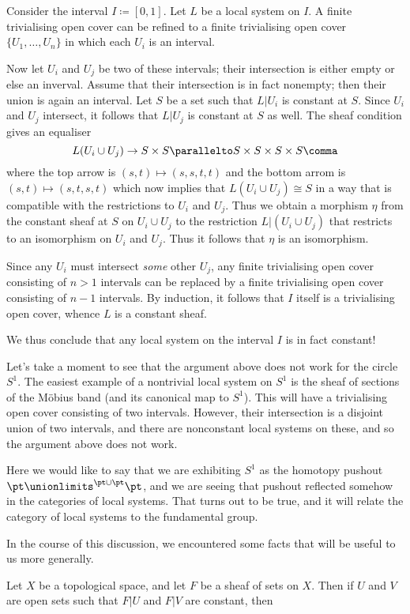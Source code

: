 \begin{exm}
	Consider the interval $ I \coloneq [0, 1] $.
	Let $ L $ be a local system on $ I $.
	A finite trivialising open cover can be refined to a finite trivialising open cover $ \{ U_1, \dots, U_n \} $ in which each $ U_{i} $ is an interval.

	Now let $ U_{i} $ and $ U_{j} $ be two of these intervals;
	their intersection is either empty or else an inverval.
	Assume that their intersection is in fact nonempty;
	then their union is again an interval.
	Let $ S $ be a set such that $ L | U_{i} $ is constant at $ S $.
	Since $ U_{i} $ and $ U_{j} $ intersect, it follows that $ L | U_{j} $ is constant at $ S $ as well.
	The sheaf condition gives an equaliser
	\[
		L(U_{i} \cup U_{j}) \to S \times S \parallelto S \times S \times S \times S \comma
	\]
	where the top arrow is $ (s, t) \mapsto (s, s, t, t) $ and the bottom arrom is $ (s, t) \mapsto (s, t, s, t) $ which now implies that $ L(U_{i} \cup U_{j}) \cong S $ in a way that is compatible with the restrictions to $ U_{i} $ and $ U_{j} $.
	Thus we obtain a morphism $ \eta $ from the constant sheaf at $ S $ on $ U_{i} \cup U_{j} $ to the restriction $ L | (U_{i} \cup U_{j}) $
	that restricts to an isomorphism on $ U_{i} $ and $ U_{j} $.
	Thus it follows that $ \eta $ is an isomorphism.

	Since any $ U_i $ must intersect \emph{some} other $ U_j $, any finite trivialising open cover consisting of $ n > 1$ intervals can be replaced by a finite trivialising open cover consisting of $ n - 1 $ intervals.
	By induction, it follows that $ I $ itself is a trivialising open cover, whence $ L $ is a constant sheaf.

	We thus conclude that any local system on the interval $ I $ is in fact constant!
\end{exm}

\begin{ctrexm}
	Let's take a moment to see that the argument above does not work for the circle $ S^1 $.
	The easiest example of a nontrivial local system on $ S^1 $ is the sheaf of sections of the Möbius band (and its canonical map to $ S^1 $).
	This will have a trivialising open cover consisting of two intervals.
	However, their intersection is a disjoint union of two intervals, and there are nonconstant local systems on these, and so the argument above does not work.

	Here we would like to say that we are exhibiting $ S^1 $ as the homotopy pushout $ \pt \unionlimits^{\pt \cup \pt} \pt $, and we are seeing that pushout reflected somehow in the categories of local systems.
	That turns out to be true, and it will relate the category of local systems to the fundamental group.
\end{ctrexm}

In the course of this discussion, we encountered some facts that will be useful to us more generally.

\begin{lem}
	Let $ X $ be a topological space, and let $ F $ be a sheaf of sets on $ X $.
	Then if $ U $ and $ V $ are open sets such that $ F | U $ and $ F | V $ are constant, then 
\end{lem}




